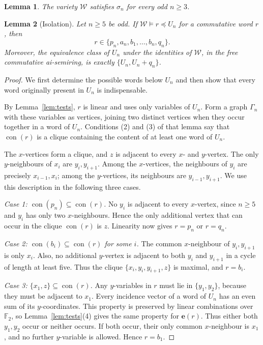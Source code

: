 \documentclass[10pt,a4paper]{amsart}
\newtheorem{lemma}{Lemma}
\newcommand{\F}{\mathbb F_2}
\newcommand{\W}{\mathcal W}
\DeclareMathOperator{\con}{con}
\newcommand{\ivec}[1]{\mathbf e(#1)}
\begin{document}
\begin{lemma}\label{lem:test-valid}
The variety $\W$ satisfies $\sigma_n$ for every odd $n\geq3$.
\end{lemma}

\begin{lemma}[Isolation]\label{lem:isolation}
Let $n\geq5$ be odd. If $\W\models r\preceq U_n$ for a
commutative word $r$, then
\[
r\in\{p_n,a_n,b_1,\ldots,b_n,q_n\}.
\]
Moreover, the equivalence class of $U_n$ under the identities of
$\W$, in the free commutative ai-semiring, is exactly
$\{U_n,U_n+q_n\}$.
\end{lemma}

\begin{proof}
We first determine the possible words below $U_n$ and then show
that every word originally present in $U_n$ is indispensable.

By Lemma~\ref{lem:tests}, $r$ is linear and uses only variables of
$U_n$. Form a graph $\Gamma_n$ with these variables as vertices,
joining two distinct vertices when they occur together in a word
of $U_n$. Conditions (2) and (3) of that lemma say that
$\con(r)$ is a clique containing the content of at least one word
of $U_n$.

The $x$-vertices form a clique, and $z$ is adjacent to every
$x$- and $y$-vertex. The only $y$-neighbours of $x_i$ are
$y_i,y_{i+1}$. Among the $x$-vertices, the neighbours of $y_i$
are precisely $x_{i-1},x_i$; among the $y$-vertices, its neighbours
are $y_{i-1},y_{i+1}$. We use this description in the following
three cases.

\emph{Case 1: $\con(p_n)\subseteq\con(r)$.}
No $y_i$ is adjacent to every $x$-vertex, since $n\geq5$ and
$y_i$ has only two $x$-neighbours. Hence the only additional
vertex that can occur in the clique $\con(r)$ is $z$.
Linearity now gives $r=p_n$ or $r=q_n$.

\emph{Case 2: $\con(b_i)\subseteq\con(r)$ for some $i$.}
The common $x$-neighbour of $y_i,y_{i+1}$ is only $x_i$.
Also, no additional $y$-vertex is adjacent to both $y_i$ and
$y_{i+1}$ in a cycle of length at least five. Thus the clique
$\{x_i,y_i,y_{i+1},z\}$ is maximal, and $r=b_i$.

\emph{Case 3: $\{x_1,z\}\subseteq\con(r)$.}
Any $y$-variables in $r$ must lie in $\{y_1,y_2\}$, because
they must be adjacent to $x_1$. Every incidence vector of a
word of $U_n$ has an even sum of its $y$-coordinates.
This property is preserved by linear combinations over $\F$,
so Lemma~\ref{lem:tests}(4) gives the same property for
$\ivec{r}$. Thus either both $y_1,y_2$ occur or neither occurs.
If both occur, their only common $x$-neighbour is $x_1$,
and no further $y$-variable is allowed. Hence $r=b_1$.


\end{proof}
\end{document}
